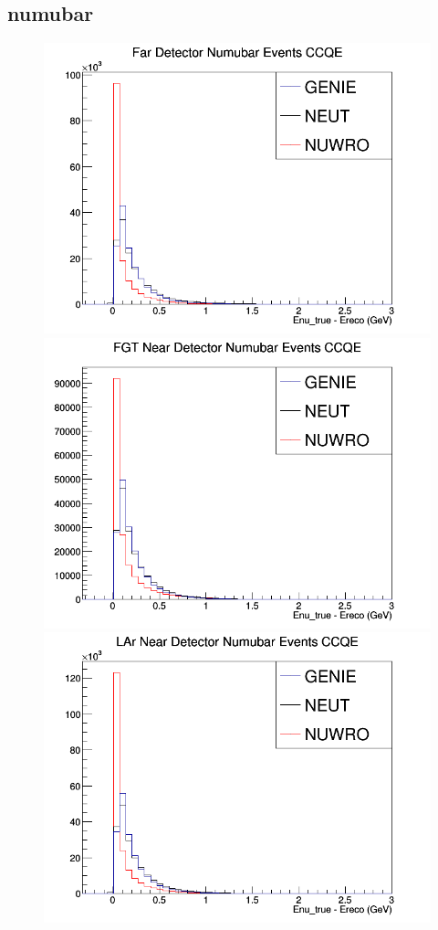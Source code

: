 \documentclass[12pt]{article}
\begin{document}
\subsection{numubar}
\begin{figure}[h]
\includegraphics[width=\linewidth]{Ereco_Etrue/numubar_FD_CCQE.png}
\endminipage
{}
\includegraphics[width=\linewidth]{Ereco_Etrue/numubar_FGT_CCQE.png}
\endminipage
{}
\includegraphics[width=\linewidth]{Ereco_Etrue/numubar_LAr_CCQE.png}

\end{figure}
\end{document}
